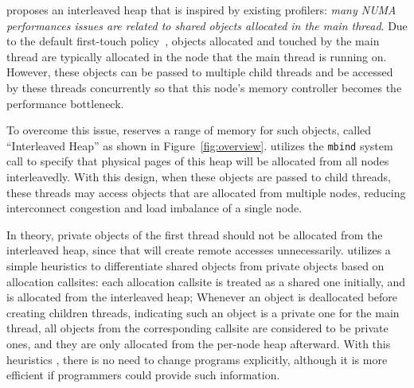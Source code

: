 \NA{} proposes an interleaved heap that is inspired by existing profilers\cite{XuNuma, MemProf}: \textit{many NUMA performances issues are related to shared objects allocated in the main thread}. Due to the default first-touch policy~\cite{lameter2013numa, diener2015locality}, objects allocated and touched by the main thread are typically allocated in the node that the main thread is running on. However, these objects can be passed to multiple child threads and be accessed by these threads concurrently so that this node's memory controller becomes the performance bottleneck. 

To overcome this issue, \NA{} reserves a range of memory for such objects, called ``Interleaved Heap'' as shown in Figure~\ref{fig:overview}. \NA{} utilizes the \texttt{mbind} system call to specify that physical pages of this heap will be allocated from all nodes interleavedly. With this design, when these objects are passed to child threads, these threads may access objects that are allocated from multiple nodes, reducing interconnect congestion and load imbalance of a single node. 

In theory, private objects of the first thread should not be allocated from the interleaved heap, since that will create remote accesses unnecessarily. \NM{} utilizes a simple heuristics to differentiate shared objects from private objects based on allocation callsites: each allocation callsite is treated as a shared one initially, and is allocated from the interleaved heap; Whenever an object is deallocated before creating children threads, indicating such an object is a private one for the main thread, all objects from the corresponding callsite are considered to be private ones, and they are only allocated from the per-node heap afterward. With this heuristics , there is no need to change programs explicitly, although it is more efficient if programmers could provide such information. 

